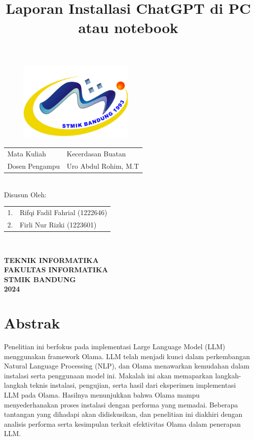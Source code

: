 \documentclass[a4paper,12pt, bahasa]{article}
\date{}
\title{Laporan Installasi ChatGPT di PC atau notebook}
\begin{document}
  

\maketitle
\begin{figure}[ht]
  \begin{center}
    \includegraphics[width=0.5\textwidth]{images/logo.png}
  \end{center}
\end{figure}
\vspace{1 cm}
\thispagestyle{empty}

\begin{center}
    \begin{tabular}{ll}
         Mata Kuliah& Kecerdasan Buatan\\
         Dosen Pengampu& Uro Abdul Rohim, M.T \\
    \end{tabular}\\
    \vspace{0.5cm}
    Disusun Oleh: \\
    \begin{tabular}{ll}
         1.& Rifqi Fadil Fahrial (1222646)\\
         2.& Firli Nur Rizki (1223601)\\
    \end{tabular}\\
    \vspace{3cm}

  \textbf {TEKNIK INFORMATIKA} \\
  \textbf {FAKULTAS INFORMATIKA} \\
  \textbf {STMIK BANDUNG} \\
  \textbf {2024} \linebreak
\end{center}
\pagebreak
\section*{Abstrak}
\setcounter{page}{1}
Penelitian ini berfokus pada implementasi Large Language Model (LLM) menggunakan
framework Olama. LLM telah menjadi kunci dalam perkembangan Natural Language
Processing (NLP), dan Olama menawarkan kemudahan dalam instalasi serta penggunaan
model ini. Makalah ini akan memaparkan langkah-langkah teknis instalasi, pengujian, serta
hasil dari eksperimen implementasi LLM pada Olama. Hasilnya menunjukkan bahwa Olama
mampu menyederhanakan proses instalasi dengan performa yang memadai. Beberapa
tantangan yang dihadapi akan didiskusikan, dan penelitian ini diakhiri dengan analisis
performa serta kesimpulan terkait efektivitas Olama dalam penerapan LLM.
\end{document}
